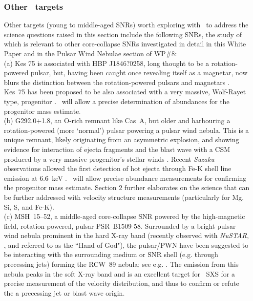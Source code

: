 \documentclass[11pt,a4paper]{article}
\begin{document}
{\subsubsection{Other \ah\ targets}
Other targets (young to middle-aged SNRs) worth exploring with \ah\ to address the science questions raised in this section
include the following SNRs, the study of which is relevant to other core-collapse SNRs investigated in detail
in this White Paper and in the Pulsar Wind Nebulae section of WP\#8:\\
(a)  Kes 75 is associated with HBP J1846?0258, long thought to be a rotation-powered pulsar, 
but, having been caught once revealing itself as a magnetar, now blurs the distinction between the rotation-powered pulsars and magnetars
\citep{KumarSSH2008, Gavriil2008, Ng2008}. Kes~75 has been proposed to
be also associated with a very massive, Wolf-Rayet type, progenitor
\citep{Morton2007}. \ah\ will allow
a precise determination of abundances for the progenitor mass estimate.\\
 (b) G292.0+1.8, an O-rich remnant like Cas~A, 
but older and harbouring a rotation-powered (more `normal') pulsar powering a pulsar wind nebula.
This is a unique remnant, likely originating from an asymmetric explosion, 
and showing evidence for interaction of ejecta fragments and
the blast wave with a CSM produced by a very massive progenitor's stellar winds
 \citep{hughes01, gonzalez03, park07}. Recent {\it Suzaku} observations allowed the first detection of hot ejecta
 through Fe-K shell line emission at 6.6~keV \citep{kamitsukasa14}.
  \ah\ will allow precise abundance measurements for confirming the progenitor mass estimate.
  Section 2 further elaborates on the science that can be further addressed with velocity structure measurements (particularly for Mg, Si, S, and Fe-K).\\
  (c) MSH~15--52, a middle-aged core-collapse SNR powered by the high-magnetic field, rotation-powered, pulsar
PSR~B1509-58. Surrounded by a bright pulsar wind nebula prominent in the hard X-ray band (recently observed with {\it NuSTAR},
\citet{An14}, and referred to as the ``Hand of God"),
the pulsar/PWN have been suggested to be  interacting with the surrounding medium or SNR shell (e.g. through precessing jets) forming the RCW~89 nebula;
see e.g. \citet{yatsu05}.
The emission from this nebula peaks in the soft X-ray band and is an excellent target for \ah\ SXS for a precise measurement of the velocity distribution, and thus
to confirm or refute the a precessing jet or blast wave origin.\\ 
}
\end{document}
